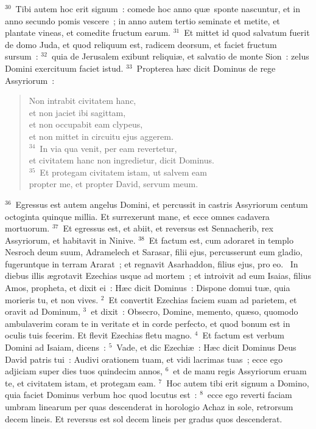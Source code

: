 ${}^{30}$~Tibi autem hoc erit signum~: comede hoc anno qu\ae\ sponte nascuntur, et in anno secundo pomis vescere~; in anno autem tertio seminate et metite, et plantate vineas, et comedite fructum earum.
${}^{31}$~Et mittet id quod salvatum fuerit de domo Juda, et quod reliquum est, radicem deorsum, et faciet fructum sursum~:
${}^{32}$~quia de Jerusalem exibunt reliqui\ae , et salvatio de monte Sion~: zelus Domini exercituum faciet istud.
${}^{33}$~Propterea h\ae c dicit Dominus de rege Assyriorum~: \begin{flushleft}\begin{verse}Non intrabit civitatem hanc,\\ et non jaciet ibi sagittam,\\ et non occupabit eam clypeus,\\ et non mittet in circuitu ejus aggerem.\\
${}^{34}$~In via qua venit, per eam revertetur,\\ et civitatem hanc non ingredietur, dicit Dominus.\\
${}^{35}$~Et protegam civitatem istam, ut salvem eam\\ propter me, et propter David, servum meum.\end{verse}\end{flushleft}


${}^{36}$~Egressus est autem angelus Domini, et percussit in castris Assyriorum centum octoginta quinque millia. Et surrexerunt mane, et ecce omnes cadavera mortuorum.
${}^{37}$~Et egressus est, et abiit, et reversus est Sennacherib, rex Assyriorum, et habitavit in Ninive.
${}^{38}$~Et factum est, cum adoraret in templo Nesroch deum suum, Adramelech et Sarasar, filii ejus, percusserunt eum gladio, fugeruntque in terram Ararat~; et regnavit Asarhaddon, filius ejus, pro eo.
~In diebus illis \ae grotavit Ezechias usque ad mortem~; et introivit ad eum Isaias, filius Amos, propheta, et dixit ei~: H\ae c dicit Dominus~: Dispone domui tu\ae , quia morieris tu, et non vives.
${}^{2}$~Et convertit Ezechias faciem suam ad parietem, et oravit ad Dominum,
${}^{3}$~et dixit~: Obsecro, Domine, memento, qu\ae so, quomodo ambulaverim coram te in veritate et in corde perfecto, et quod bonum est in oculis tuis fecerim. Et flevit Ezechias fletu magno.
${}^{4}$~Et factum est verbum Domini ad Isaiam, dicens~:
${}^{5}$~Vade, et dic Ezechi\ae~: H\ae c dicit Dominus Deus David patris tui~: Audivi orationem tuam, et vidi lacrimas tuas~; ecce ego adjiciam super dies tuos quindecim annos,
${}^{6}$~et de manu regis Assyriorum eruam te, et civitatem istam, et protegam eam.
${}^{7}$~Hoc autem tibi erit signum a Domino, quia faciet Dominus verbum hoc quod locutus est~:
${}^{8}$~ecce ego reverti faciam umbram linearum per quas descenderat in horologio Achaz in sole, retrorsum decem lineis. Et reversus est sol decem lineis per gradus quos descenderat.


